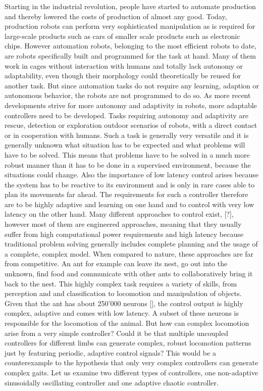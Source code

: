\documentclass[main]{subfiles}
\begin{document}
Starting in the industrial revolution, people have started to automate production and thereby lowered the costs of production of almost any good. Today, production robots can perform very sophisticated manipulation as is required for large-scale products such as cars of smaller scale products such as electronic chips. However automation robots, belonging to the most efficient robots to date, are robots specifically built and programmed for the task at hand. Many of them work in cages without interaction with humans and totally lack autonomy or adaptability, even though their morphology could theoretically be reused for another task. But since automation tasks do not require any learning, adaption or autonomous behavior, the robots are not programmed to do so. As more recent developments strive for more autonomy and adaptivity in robots, more adaptable controllers need to be developed. Tasks requiring autonomy and adaptivity are rescue, detection or exploration outdoor scenarios of robots, with a direct contact or in cooperation with humans. Such a task is generally very versatile and it is generally unknown what situation has to be expected and what problems will have to be solved. This means that problems have to be solved in a much more robust manner than it has to be done in a supervised environment, because the situations could change. Also the importance of low latency control arises because the system has to be reactive to its environment and is only in rare cases able to plan its movements far ahead. The requirements for such a controller therefore are to be highly adaptive and learning on one hand and to control with very low latency on the other hand. Many different approaches to control exist, [?], however most of them are engineered approaches, meaning that they usually suffer from high computational power requirements and high latency because traditional problem solving generally includes complete planning and the usage of a complete, complex model. When compared to nature, these approaches are far from competitive. An ant for example can leave its nest, go out into the unknown, find food and communicate with other ants to collaboratively bring it back to the nest. This highly complex task requires a variety of skills, from perception and and classification to locomotion and manipulation of objects. Given that the ant has about 250'000 neurons [], the control output is highly complex, adaptive and comes with low latency. A subset of these neurons is responsible for the locomotion of the animal. But how can complex locomotion arise from a very simple controller? Could it be that multiple uncoupled controllers for different limbs can generate complex, robust locomotion patterns just by featuring periodic, adaptive control signals? This would be a counterexample to the hypothesis that only very complex controllers can generate complex gaits. Let us examine two different types of controllers, one non-adaptive sinusoidally oscillating controller and one adaptive chaotic controller.
\end{document}
